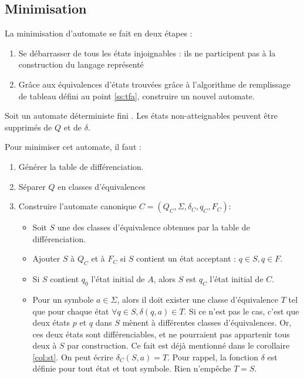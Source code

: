 \subsection{Minimisation}
La minimisation d'automate se fait en deux étapes :
\begin{enumerate}
 \item Se débarrasser de tous les états injoignables : ils ne participent pas à la construction du langage représenté
 \item Grâce aux équivalences d'états trouvées grâce à l'algorithme de remplissage de tableau défini au point \ref{ss:tfa}, construire un nouvel automate.
\end{enumerate}

Soit un automate déterministe fini \automaton. Les états non-atteignables peuvent être supprimés de $Q$ et de $\delta$.

Pour minimiser cet automate, il faut :
\begin{enumerate}
 \item Générer la table de différenciation.
 \item Séparer $Q$ en classes d'équivalences
 \item Construire l'automate canonique $C=(Q_C,\Sigma, \delta_C, q_C, F_C)$:
 \begin{itemize}
	 \item Soit $S$ une des classes d'équivalence obtenues par la table de différenciation.
	 \item Ajouter $S$ à $Q_C$ et à $F_C$ si $S$ contient un état acceptant : $q\in S, q\in F$.
	 \item Si $S$ contient $q_0$ l'état initial de $A$, alors $S$ est $q_C$ l'état initial de $C$.
	 \item Pour un symbole $a \in \Sigma$, alors il doit exister une classe d'équivalence $T$ tel que pour chaque état $\forall q \in S,\delta(q,a) \in T$. Si ce n'est pas le cas, c'est que deux états $p$ et $q$ dans $S$ mènent à différentes classes d'équivalences. Or, ces deux états sont différenciables, et ne pourraient pas appartenir tous deux à $S$ par construction. Ce fait est déjà mentionné dans le corollaire \ref{col:st}. On peut écrire $\delta_C(S,a)=T$. Pour rappel, la fonction $\delta$ est définie pour tout état et tout symbole. Rien n'empêche $T=S$.
 \end{itemize}
\end{enumerate}


